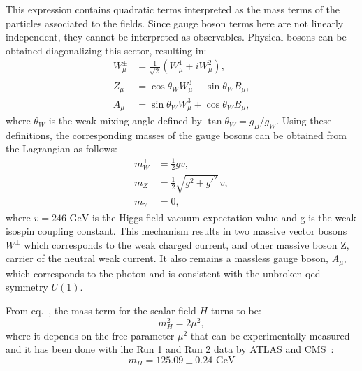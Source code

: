 This expression contains quadratic terms interpreted as the mass terms of the particles associated to the fields. Since gauge boson terms here are not linearly independent, they cannot be interpreted as observables. Physical bosons can be obtained diagonalizing this sector, resulting in:
\begin{align}
W^\pm_\mu &= \frac{1}{\sqrt{2}} \left( W^1_\mu \mp i W^2_\mu \right), \\
Z_\mu &= \cos\theta_W W^3_\mu - \sin\theta_W B_\mu, \\
A_\mu &= \sin\theta_W W^3_\mu + \cos\theta_W B_\mu,
\end{align}
where $\theta_W$ is the weak mixing angle defined by $\tan \theta_W = g_B /g_W$.
Using these definitions, the corresponding masses of the gauge bosons can be obtained from the Lagrangian as follows:
\begin{align}
m^{\pm}_W &= \frac{1}{2} g v, \\
m_Z &= \frac{1}{2} \sqrt{g^2 + g'^2} \, v, \\
m_\gamma &= 0,
\end{align}
where $v = 246 \text{  GeV}$ is the Higgs field vacuum expectation value and g is the weak isospin coupling constant. 
This mechanism results in two massive vector bosons $W^{\pm}$ which corresponds to the weak charged current, and other massive boson Z, carrier of the neutral weak current. It also remains a massless gauge boson, $A_{\mu}$, which corresponds to the photon and is consistent with the unbroken \acrshort{qed} symmetry $U(1)$.

From eq.~\cite{eq:ew_broken}, the mass term for the scalar field $H$ turns to be:
\begin{equation}
m_H^2 = 2 \mu^2,
\end{equation}
where it depends on the free parameter $\mu^2$ that can be experimentally measured and it has been done with \acrshort{lhc} Run 1 and Run 2 data by ATLAS and CMS~\cite{ATLASCMS}:
\begin{equation}
m_H = 125.09 \pm 0.24 \text{ GeV}
\end{equation}

